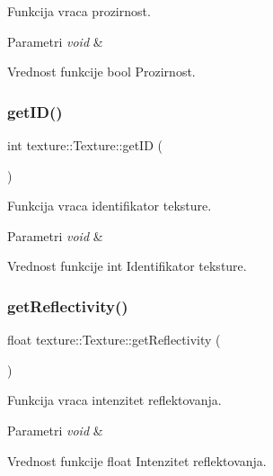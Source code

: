 Funkcija vraca prozirnost. 


\begin{DoxyParams}{Parametri}
{\em void} & \\
\hline
\end{DoxyParams}
\begin{DoxyReturn}{Vrednost funkcije}
bool Prozirnost. 
\end{DoxyReturn}
\mbox{\label{classtexture_1_1Texture_ad68f41e90862c73b209743625b64dffa}} 
\subsubsection{\texorpdfstring{get\+I\+D()}{getID()}}
{\footnotesize\ttfamily int texture\+::\+Texture\+::get\+ID (\begin{DoxyParamCaption}{ }\end{DoxyParamCaption})}



Funkcija vraca identifikator teksture. 


\begin{DoxyParams}{Parametri}
{\em void} & \\
\hline
\end{DoxyParams}
\begin{DoxyReturn}{Vrednost funkcije}
int Identifikator teksture. 
\end{DoxyReturn}
\mbox{\label{classtexture_1_1Texture_a0c2fb82845e340acced35d96a80bbb25}} 
\subsubsection{\texorpdfstring{get\+Reflectivity()}{getReflectivity()}}
{\footnotesize\ttfamily float texture\+::\+Texture\+::get\+Reflectivity (\begin{DoxyParamCaption}{ }\end{DoxyParamCaption})}



Funkcija vraca intenzitet reflektovanja. 


\begin{DoxyParams}{Parametri}
{\em void} & \\
\hline
\end{DoxyParams}
\begin{DoxyReturn}{Vrednost funkcije}
float Intenzitet reflektovanja. 
\end{DoxyReturn}
\mbox{\label{classtexture_1_1Texture_a9a7667b3a055b2e0c27c2490d4ab4e7e}} 

